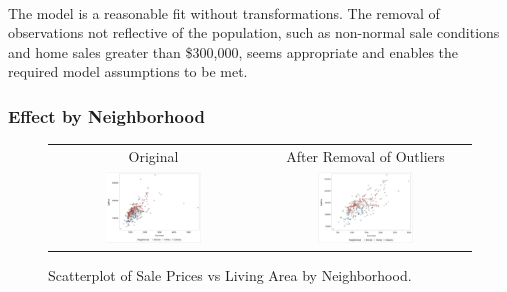 \documentclass[11pt]{scrartcl} %
\begin{document}
\paragraph{}The model is a reasonable fit without transformations.  The removal of observations not reflective of the population, such as non-normal sale conditions and home sales greater than \$300,000, seems appropriate and enables the required model assumptions to be met.

\subsubsection{Effect by Neighborhood}
\begin{figure}[h] %
	\centering
	\begin{tabular}{p{} p{}}
\hline	
	\multicolumn{1}{|c|}{Original} &  \multicolumn{1}{|c|}{After Removal of Outliers} \\
		\multicolumn{1}{|c|}{\includegraphics[width=0.48\textwidth]{../graphics/A1NHscat1}} &
		\multicolumn{1}{|c|}{\includegraphics[width=0.48\textwidth]{../graphics/A1NHscat2}}\\
		\hline
	\end{tabular}		
	\caption{Scatterplot of Sale Prices vs Living Area by Neighborhood.}
	\label{fig:NBscat}
\end{figure}
\end{document}

